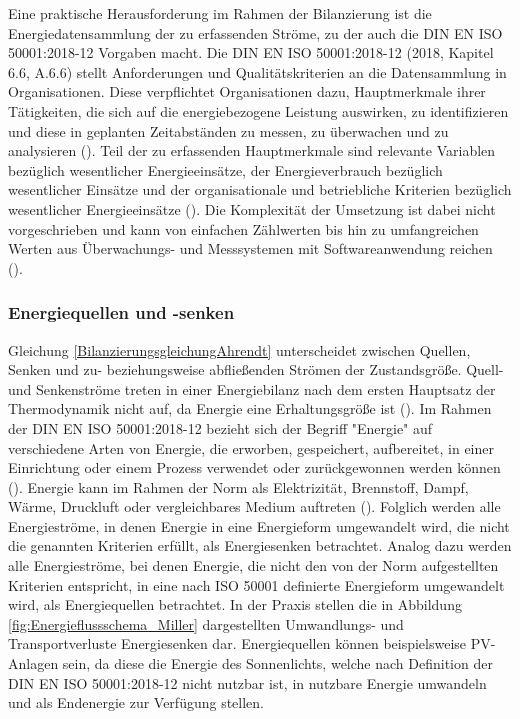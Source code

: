 Eine praktische Herausforderung im Rahmen der Bilanzierung ist die Energiedatensammlung der zu erfassenden Ströme, zu der auch die DIN EN ISO 50001:2018-12 Vorgaben macht.
Die DIN EN ISO 50001:2018-12 (2018, Kapitel 6.6, A.6.6) stellt Anforderungen und Qualitätskriterien an die Datensammlung in Organisationen.
Diese verpflichtet Organisationen dazu, Hauptmerkmale ihrer Tätigkeiten, die sich auf die energiebezogene Leistung auswirken, zu identifizieren und diese in geplanten
Zeitabständen zu messen, zu überwachen und zu analysieren (\cite[S. 23]{DIN50001.2018}).
Teil der zu erfassenden Hauptmerkmale sind relevante Variablen bezüglich wesentlicher Energieeinsätze, der Energieverbrauch bezüglich wesentlicher Einsätze
und der organisationale und betriebliche Kriterien bezüglich wesentlicher Energieeinsätze (\cite[S. 23]{DIN50001.2018}).
Die Komplexität der Umsetzung ist dabei nicht vorgeschrieben und kann von einfachen Zählwerten bis hin zu umfangreichen Werten aus Überwachungs- und Messsystemen mit
Softwareanwendung reichen (\cite[S. 36]{DIN50001.2018}).

\subsubsection{Energiequellen und -senken}
Gleichung \eqref{BilanzierungsgleichungAhrendt} unterscheidet zwischen Quellen, Senken und zu- beziehungsweise abfließenden Strömen der Zustandsgröße.
Quell- und Senkenströme treten in einer Energiebilanz nach dem ersten Hauptsatz der Thermodynamik nicht auf, da Energie eine Erhaltungsgröße ist (\cite[S. 14]{Ahrendts.2014}).
Im Rahmen der DIN EN ISO 50001:2018-12 bezieht sich der Begriff "Energie" auf verschiedene Arten von Energie, die erworben, gespeichert, aufbereitet, in einer Einrichtung oder einem Prozess verwendet
oder zurückgewonnen werden können (\cite[Kapitel 3.5.1]{DIN50001.2018}). Energie kann im Rahmen der Norm als Elektrizität, Brennstoff, Dampf, Wärme, Druckluft oder vergleichbares Medium auftreten
(\cite[Kapitel 3.5.1]{DIN50001.2018}).
Folglich werden alle Energieströme, in denen Energie in eine Energieform umgewandelt wird, die nicht die genannten Kriterien erfüllt, als Energiesenken betrachtet.
Analog dazu werden alle Energieströme, bei denen Energie, die nicht den von der Norm aufgestellten Kriterien entspricht, in eine nach ISO 50001 definierte Energieform
umgewandelt wird, als Energiequellen betrachtet.
In der Praxis stellen die in Abbildung \eqref{fig:Energieflussschema_Miller} dargestellten Umwandlungs- und Transportverluste Energiesenken dar. Energiequellen können beispielsweise
PV-Anlagen sein, da diese die Energie des Sonnenlichts, welche nach Definition der DIN EN ISO 50001:2018-12 nicht nutzbar ist, in nutzbare Energie umwandeln und als
Endenergie zur Verfügung stellen.

